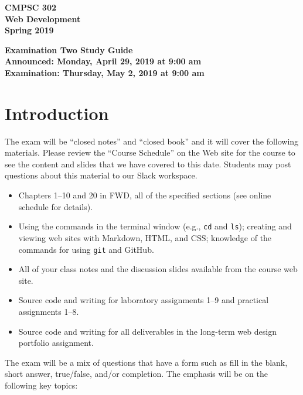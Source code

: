 \documentclass[11pt]{article}
\newcommand{\assignmentduedate}{May 2}
\newcommand{\assignmentassignedate}{April 29}
\newcommand{\assignmentnumber}{Two}
\newcommand{\labyear}{2019}
\newcommand{\assignedday}{Monday}
\newcommand{\dueday}{Thursday}
\newcommand{\labtime}{9:00 am}
\newcommand{\assigneddate}{Announced: \assignedday, \assignmentassignedate, \labyear{} at \labtime{}}
\newcommand{\duedate}{Examination: \dueday, \assignmentduedate, \labyear{} at \labtime{}}
\newcommand{\program}[1]{\lstinline{#1}}
\newcommand{\guidetitle}[1]
{
  \begin{center}
    \begin{center}
      \bf
      CMPSC 302\\Web Development\\
      Spring 2019\\
      \medskip
    \end{center}
    \bf
    #1
  \end{center}
}
\begin{document}
\thispagestyle{empty}

\guidetitle{Examination \assignmentnumber{} Study Guide \\ \assigneddate{} \\ \duedate{}}

\section*{Introduction}

\noindent
The exam will be ``closed notes'' and ``closed book'' and it will cover the
following materials. Please review the ``Course Schedule'' on the Web site for
the course to see the content and slides that we have covered to this date.
Students may post questions about this material to our Slack workspace.

\begin{itemize}

  \itemsep 0in

  \item Chapters 1--10 and 20 in FWD, all of the specified sections (see
    online schedule for details).

  \item Using the commands in the terminal window (e.g., \program{cd} and
    \program{ls}); creating and viewing web sites with Markdown, HTML, and CSS;
    knowledge of the commands for using \program{git} and GitHub.

  \item All of your class notes and the discussion slides available from the
    course web site.

  \item Source code and writing for laboratory assignments 1--9 and practical
    assignments 1--8.

  \item Source code and writing for all deliverables in the long-term web design
    portfolio assignment.

\end{itemize}

\noindent The exam will be a mix of questions that have a form such as fill in
the blank, short answer, true/false, and/or completion. The emphasis will be on
the following key topics:
\end{document}
